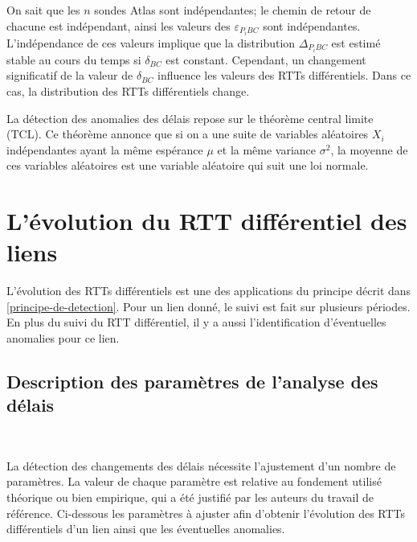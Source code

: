 On sait que les $n$ sondes Atlas sont indépendantes; le chemin de retour de chacune est indépendant, ainsi les valeurs des  $\varepsilon_{P_{i}BC}$ sont  indépendantes. L'indépendance de ces valeurs implique que la distribution $\Delta_{P_{i}BC}$ est estimé  stable au cours du temps si $\delta_{BC}$ est constant. Cependant, un changement significatif de la valeur de $\delta_{BC}$ influence les valeurs des RTTs différentiels. Dans ce cas, la distribution des RTTs différentiels change. 


La détection des anomalies des délais repose sur le théorème  central limite (TCL). Ce théorème  annonce que si on a une suite de variables aléatoires $X_i$ indépendantes ayant la même espérance $\mu$ et la même variance $\sigma^2$, la moyenne de ces variables aléatoires est une variable aléatoire qui suit une loi normale. 




\section{L'évolution du RTT différentiel des liens}

L'évolution des RTTs différentiels est une des applications du principe décrit dans  \ref{principe-de-detection}. Pour un lien donné, le suivi est fait sur plusieurs  périodes. En plus du suivi du RTT différentiel, il y a aussi l'identification d'éventuelles anomalies pour ce lien.

\subsection{Description des paramètres de l'analyse des délais} \label{par:parametre-de-lanalyse}~

La détection des changements des délais nécessite l'ajustement d'un nombre de paramètres. La valeur de chaque paramètre est relative au  fondement utilisé théorique ou bien empirique, qui a été  justifié par les auteurs du travail de référence.   Ci-dessous les paramètres à ajuster afin d'obtenir l'évolution des RTTs différentiels d'un lien ainsi que les éventuelles anomalies.  

